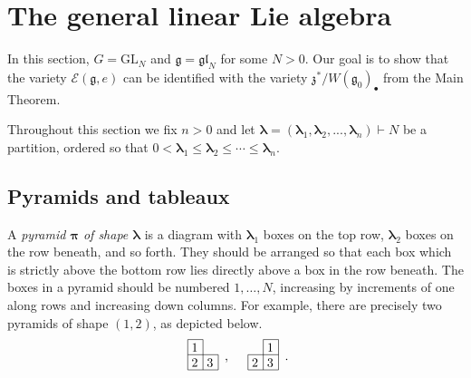 \documentclass[twoside,12pt,reqno]{amsart}
\theoremstyle{remark}
\numberwithin{equation}{section}
\def\blambda{{\bm{\lambda}}}
\def\bpi{{\bm{\pi}}}
\def\GL{\mathrm{GL}}
\def\g{{\mathfrak g}}
\def\gl{\mathfrak{gl}}
\def\z{\mathfrak{z}}
\def\E{\mathcal{E}}
\begin{document}
\section{The general linear Lie algebra}
\label{S:generallinearalgebra}


In this section, $G=\GL_N$ and $\g=\gl_N$ for some $N>0$. Our goal is to show that the variety $\E(\g,e)$ can be identified with the variety $\z^*/W(\g_0)_\bullet$ from the Main Theorem. 

Throughout this section we fix $n > 0$ and let $\blambda = (\blambda_1,\blambda_2,...,\blambda_n) \vdash N$ be a partition, ordered so that $0 < \blambda_1 \le \blambda_2 \le \cdots \le \blambda_n$.

\subsection{Pyramids and tableaux} \label{ss_pyrtab}

A {\em pyramid $\bpi$ of shape $\blambda$} is a diagram with $\blambda_1$ boxes on the top row, $\blambda_{2}$ boxes on the row beneath, and so forth. They should be arranged so that each box which is strictly above the bottom row lies directly above a box in the row beneath. The boxes in a pyramid should be numbered $1,\ldots,N$, increasing by increments of one along rows and increasing down columns. For example, there are precisely two pyramids of shape $(1,2)$, as depicted below.
\begin{equation}
\label{e:somepyramids}
\begin{array}{c}
\begin{picture}(24,24) \put(0,0){\line(1,0){24}}
\put(0,12){\line(1,0){24}} \put(0,24){\line(1,0){12}}
\put(0,0){\line(0,1){24}} \put(12,0){\line(0,1){24}}
\put(24,0){\line(0,1){12}} 
\put(3,14.5){\hbox{1}}
\put(3,2.5){\hbox{2}}
\put(15,2.5){\hbox{3}}
\end{picture}
\end{array}
,\:\:\:\:
\begin{array}{c}
\begin{picture}(24,24) \put(0,0){\line(1,0){24}}
\put(0,12){\line(1,0){24}} \put(12,24){\line(1,0){12}}
\put(0,0){\line(0,1){12}} \put(12,0){\line(0,1){24}}
\put(24,0){\line(0,1){24}} 
\put(15,14.5){\hbox{1}}
\put(3,2.5){\hbox{2}}
\put(15,2.5){\hbox{3}}
\end{picture}
\end{array}.
\end{equation}
\end{document}
